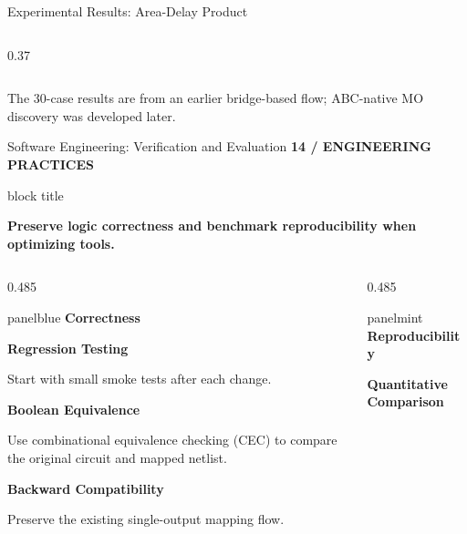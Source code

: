 \documentclass[aspectratio=169,10pt]{beamer}
\newcommand{\smalllabel}[1]{{\scriptsize\bfseries\color{Accent}\MakeUppercase{#1}}}
\newcommand{\takeaway}[1]{%
  \begin{beamercolorbox}[rounded=true,sep=0.15cm,wd=\linewidth]{block title}%
    \strut\textbf{#1}\strut
  \end{beamercolorbox}}
\begin{document}
\begin{frame}{Experimental Results: Area-Delay Product}
\begin{columns}[T,onlytextwidth]
\begin{column}{0.37\textwidth}
    \end{column}
  \end{columns}
  \vspace{0.05cm}
  {\scriptsize\color{Muted}The 30-case results are from an earlier bridge-based flow; ABC-native MO discovery was developed later.}\par
\end{frame}

\begin{frame}{Software Engineering: Verification and Evaluation}
  \vspace{0.03cm}
  \smalllabel{14 / Engineering Practices}\par\vspace{0.10cm}
  \takeaway{Preserve logic correctness and benchmark reproducibility when optimizing tools.}
  \vspace{0.16cm}
  \begin{columns}[T,onlytextwidth]
    \begin{column}{0.485\textwidth}
      \begin{beamercolorbox}[rounded=true,sep=0.19cm,wd=\linewidth]{panelblue}
        {\large\bfseries\color{AccentBlue}Correctness}\par\vspace{0.14cm}
        {\small\bfseries Regression Testing}\par
        {\small Start with small smoke tests after each change.}\par
        \vspace{0.12cm}
        {\small\bfseries Boolean Equivalence}\par
        {\small Use combinational equivalence checking (CEC) to compare the original circuit and mapped netlist.}\par
        \vspace{0.12cm}
        {\small\bfseries Backward Compatibility}\par
        {\small Preserve the existing single-output mapping flow.}
      \end{beamercolorbox}
    \end{column}
    \begin{column}{0.485\textwidth}
      \begin{beamercolorbox}[rounded=true,sep=0.19cm,wd=\linewidth]{panelmint}
        {\large\bfseries\color{Accent}Reproducibility}\par\vspace{0.14cm}
        {\small\bfseries Quantitative Comparison}\par

\end{beamercolorbox}
\end{column}
\end{columns}
\end{frame}
\end{document}
